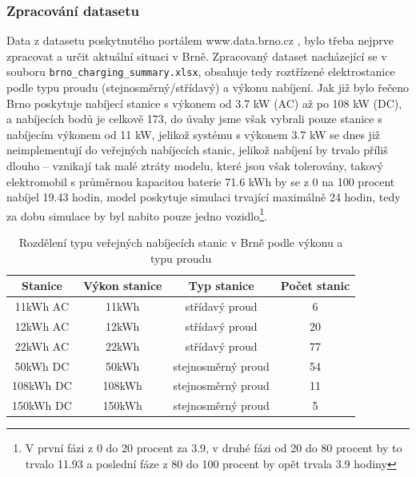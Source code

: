 \documentclass[a4paper,11pt]{article}
\begin{document}
\subsubsection{Zpracování datasetu}
\label{dataset-processing}
Data z datasetu poskytnutého portálem www.data.brno.cz \cite{data_brno}, bylo třeba nejprve zpracovat a určit 
aktuální situaci v Brně. Zpracovaný dataset nacházející se v souboru \texttt{brno\_charging\_summary.xlsx},
obsahuje tedy roztřízené elektrostanice podle typu proudu (stejnosměrný/střídavý) a výkonu nabíjení. Jak již bylo
řečeno Brno poskytuje nabíjecí stanice s výkonem od 3.7 kW (AC) až po 108 kW (DC), a nabíjecích bodů je celkově 173,
do úvahy jsme však vybrali pouze stanice s nabíjecím výkonem od 11 kW, jelikož systému s výkonem 3.7 kW se dnes již 
neimplementují do veřejných nabíjecích stanic, jelikož nabíjení by trvalo příliš dlouho -- vznikají tak malé ztráty
modelu, které jsou však tolerovány, takový elektromobil s průměrnou kapacitou baterie 71.6 kWh by se z 0 na 100 procent 
nabíjel 19.43 hodin, model poskytuje simulaci trvající maximálně 24 hodin, tedy za dobu simulace by byl nabito pouze jedno
vozidlo\footnote{V první fázi z 0 do 20 procent za 3.9, v druhé fázi od 20 do 80 procent by to trvalo 11.93 a poslední 
fáze z 80 do 100 procent by opět trvala 3.9 hodiny}.

\begin{table}[h!]
    \centering
    \vspace{0.5cm} %
    \begin{tabular}{|c|c|c|c|}
        \hline
        \textbf{Stanice} & \textbf{Výkon stanice} & \textbf{Typ stanice} & \textbf{Počet stanic}\\
        \hline
        11kWh  AC &  11kWh   & střídavý proud       & 6  \\
        \hline
        12kWh  AC &  12kWh   & střídavý proud       & 20  \\
        \hline
        22kWh  AC &  22kWh   & střídavý proud       & 77  \\
        \hline
        50kWh  DC &  50kWh   & stejnosměrný proud   & 54  \\
        \hline
        108kWh DC &  108kWh  & stejnosměrný proud   & 11  \\
        \hline
        150kWh DC &  150kWh  & stejnosměrný proud   & 5  \\
        \hline
    \end{tabular}
    \caption{Rozdělení typu veřejných nabíjecích stanic v Brně podle výkonu a typu proudu}
    \label{table:charging-stations-distribution}
    \vspace{0.5cm} %
\end{table}
\end{document}
